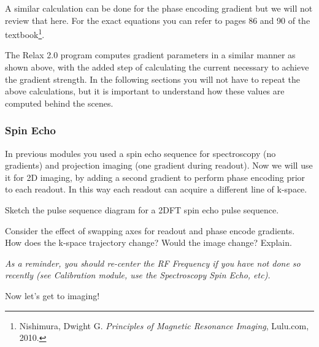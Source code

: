 A similar calculation can be done for the phase encoding gradient but we will not review that here. For the exact equations you can refer to pages 86 and 90 of the textbook\footnote{Nishimura, Dwight G. \emph{Principles of Magnetic Resonance Imaging}, Lulu.com, 2010.}.

The Relax 2.0 program computes gradient parameters in a similar manner as shown above, with the added step of calculating the current necessary to achieve the gradient strength. In the following sections you will not have to repeat the above calculations, but it is important to understand how these values are computed behind the scenes.

\subsubsection{Spin Echo} \label{sec:spin-echo}

In previous modules you used a spin echo sequence for spectroscopy (no gradients) and projection imaging (one gradient during readout). Now we will use it for 2D imaging, by adding a second gradient to perform phase encoding prior to each readout. In this way each readout can acquire a different line of k-space.

\vspace{5mm}

\noindent{}\color{red}

Sketch the pulse sequence diagram for a 2DFT spin echo pulse sequence.
\vspace{5mm}

Consider the effect of swapping axes for readout and phase encode gradients. How does the k-space trajectory change? Would the image change? Explain.

\color{black}

\vspace{5mm}

\emph{As a reminder, you should re-center the RF Frequency if you have not done so recently (see Calibration module, use the Spectroscopy Spin Echo, etc).}

\vspace{5mm}

Now let's get to imaging!

